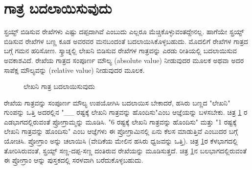 \section{ಗಾತ್ರ ಬದಲಾಯಿಸುವುದು}
ಸ್ಪ್ರಯ್ಟ್ ಬಿಡಿಸುವ ರೇಖೆಗಳು ಎಷ್ಟು ದಪ್ಪದಾಗಿವೆ ಎಂಬುದು ಎಲ್ಲರೂ ಮೆಚ್ಚಿಕೊಳ್ಳುವಂತದ್ದೇನಲ್ಲ. ಹಾಗೆಯೇ ಸ್ಪ್ರಯ್ಟ್ ಬಿಡಿಸುವ ರೇಖೆಗಳ ಬಣ್ಣ ಕೂಡ ಅವರವರ ಮನಬಂದಂತೆ ಬದಲಾಯಿಸಿಕೊಳ್ಳಬಹುದು.  ಮೊದಲಿಗೆ ರೇಖೆಗಳ ಗಾತ್ರದ ಬಗ್ಗೆ ಗಮನ ಹರಿಸೋಣ. ಸ್ಕ್ರಾಚ್ನಲ್ಲಿ ಲೇಖನಿ ಬಿಡಿಸುವ ರೇಖೆಗಳ ಗಾತ್ರವನ್ನು ಎರಡು ರೀತಿಯಲ್ಲಿ  ಬದಲಾಯಿಸುವ ಅವಕಾಶವಿದೆ.  ರೇಖೆಯ ಗಾತ್ರದ ಸಂಪೂರ್ಣ ಮೌಲ್ಯ (\textenglish{absolute value}) ನೀಡುವುದರ ಮೂಲಕ ಅಥವಾ ಅದರ ಸಾಪೆಕ್ಷ ಮೌಲ್ಯವನ್ನು (\textenglish{relative value}) ನೀಡುವುದರ ಮೂಲಕ. 

\begin{figure}[h]
\begin{center}
\begin{multicols}{2}
\begin{Scratch}[1]
\beginbox{}
\end{Scratch}


\end{multicols}

\end{center}
\caption{ಲೇಖನಿ ಗಾತ್ರ ಬದಲಾಯಿಸುವುದು}
\label{pen_linewidth}
\end{figure}
ರೇಖೆಯ ಗಾತ್ರವನ್ನು ಸಂಪೂರ್ಣ ಮೌಲ್ಯ ಉಪಯೋಗಿಸಿ ಬದಲಾಯಿಸ ಬೇಕಾದರೆ,  ಹಸಿರು ಬಣ್ಣದ "ಲೇಖನಿ" ಗುಂಪನ್ನು ಒತ್ತಿ ಅದರಲ್ಲಿನ "\_\_ ರಷ್ಟಕ್ಕೆ ಲೇಖನಿ ಗಾತ್ರವನ್ನು ಹೊಂದಿಸು"ಎಂಬ 
ಆಜ್ಞೆಯನ್ನು ಬಳಸಬೇಕು.  ಚಿತ್ರ \ref{pen_linewidth} ರ ಎಡಭಾಗದಲ್ಲಿರುವಂತೆ ಪ್ರೋಗ್ರಾಮ್ಮನ್ನು ಮೂಡಿಸಿ.  "6 ರಷ್ಟಕ್ಕೆ ಲೇಖನಿ ಗಾತ್ರವನ್ನು ಹೊಂದಿಸು" ಮತ್ತು "1 ರಷ್ಟಕ್ಕೆ ಲೇಖನಿ ಗಾತ್ರವನ್ನು ಹೊಂದಿಸು" ಎಂಬ  ಆಜ್ಞೆಗಳು ಈ ಪ್ರೋಗ್ರಾಮಿನಲ್ಲಿ ಏನು ಕೆಲಸ ಮಾಡುತ್ತಿವೆ ಎಂಬುದರ ಬಗ್ಗೆ ಯೋಚಿಸಿ.  ಪ್ರೋಗ್ರಾಂ ಅನ್ನು  ಚಲಾಯಿಸಿ (ವೇದಿಕೆಯ ಮೇಲಿನ ಹಸಿರು ಧ್ವಜವನ್ನು ಒತ್ತಿ).  ಚಿತ್ರ \ref{pen_linewidth}ರ ಕೆಳಭಾಗದಲ್ಲಿ ತೋರಿಸಿರುವಂತೆ, ಸ್ಪ್ರಯ್ಟ್ ಸಣ್ಣ-ದಪ್ಪ-ಸಣ್ಣ ದಂತಿರುವ ರೇಖೆಯನ್ನು ಮೂಡಿಸುತ್ತದೆ. ಚಿತ್ರ \ref{pen_linewidth}ನ ಬಲಭಾಗದಲ್ಲಿರುವಂತೆ  ಈ ಪ್ರೋಗ್ರಾಂ ಆನ್ನು ಪುಸ್ತಕದಲ್ಲಿ  ಸರಳವಾಗಿ ಬರೆದುಕೊಳ್ಳಬಹುದು.  


